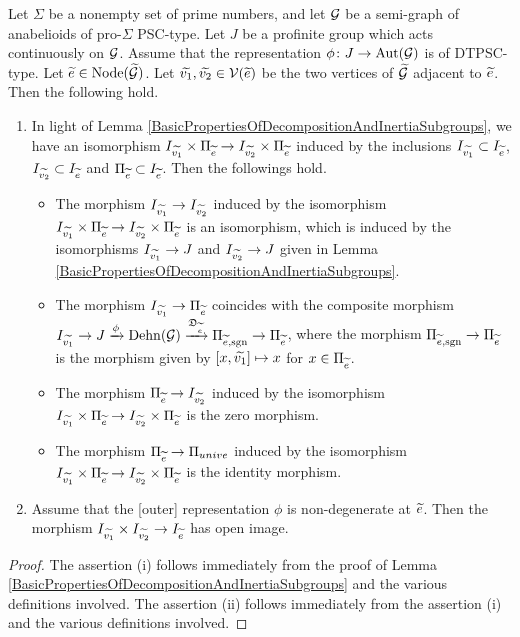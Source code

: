 \begin{lem}
  Let $\Sigma$ be a nonempty set of prime numbers, and let $\mathcal{G}$ be a semi-graph of anabelioids of pro-$\Sigma$ PSC-type. Let $J$ be a profinite group which acts continuously on $\mathcal{G}$. Assume that the representation $\phi \colon J \to \mathrm{Aut}(\mathcal{G})$ is of DTPSC-type. Let $\widetilde{e} \in \mathrm{Node}(\widetilde{\mathcal{G}})$. Let $\widetilde{v_1}, \widetilde{v_2} \in \mathcal{V}(\widetilde{e})$ be the two vertices of $\widetilde{\mathcal{G}}$ adjacent to $\widetilde{e}$. Then the following hold.
  \begin{enumerate}
    \item In light of Lemma \ref{BasicPropertiesOfDecompositionAndInertiaSubgroups}, we have an isomorphism $I_{\widetilde{v_1}} \times \Pi_{\widetilde{e}} \to I_{\widetilde{v_2}} \times \Pi_{\widetilde{e}}$ induced by the inclusions $I_{\widetilde{v_1}} \subset I_{\widetilde{e}}$, $I_{\widetilde{v_2}} \subset I_{\widetilde{e}}$ and $\Pi_{\widetilde{e}} \subset I_{\widetilde{e}}$. Then the followings hold.
    \begin{itemize}
      \item The morphism $I_{\widetilde{v_1}} \to I_{\widetilde{v_2}}$ induced by the isomorphism $I_{\widetilde{v_1}} \times \Pi_{\widetilde{e}} \to I_{\widetilde{v_2}} \times \Pi_{\widetilde{e}}$ is an isomorphism, which is induced by the isomorphisms $I_{\widetilde{v_1}} \to J$ and $I_{\widetilde{v_2}} \to J$ given in Lemma \ref{BasicPropertiesOfDecompositionAndInertiaSubgroups}.
      \item The morphism $I_{\widetilde{v_1}} \to \Pi_{\widetilde{e}}$ coincides with the composite morphism $I_{\widetilde{v_1}} \to J \xrightarrow{\phi} \mathrm{Dehn}(\mathcal{G}) \xrightarrow{\mathfrak{D}_{\widetilde{e}}} \Pi_{\widetilde{e}, \mathrm{sgn}} \to \Pi_{\widetilde{e}}$, where the morphism $\Pi_{\widetilde{e}, \mathrm{sgn}} \to \Pi_{\widetilde{e}}$ is the morphism given by $[x, \widetilde{v_1}] \mapsto x$ for $x \in \Pi_{\widetilde{e}}$.
      \item The morphism $\Pi_{\widetilde{e}} \to I_{\widetilde{v_2}}$ induced by the isomorphism $I_{\widetilde{v_1}} \times \Pi_{\widetilde{e}} \to I_{\widetilde{v_2}} \times \Pi_{\widetilde{e}}$ is the zero morphism.
      \item The morphism $\Pi_{\widetilde{e}} \to \Pi_{univ{e}}$ induced by the isomorphism $I_{\widetilde{v_1}} \times \Pi_{\widetilde{e}} \to I_{\widetilde{v_2}} \times \Pi_{\widetilde{e}}$ is the identity morphism.
    \end{itemize}
    \item Assume that the [outer] representation $\phi$ is non-degenerate at $\widetilde{e}$. Then the morphism $I_{\widetilde{v_1}} \times I_{\widetilde{v_2}} \to I_{\widetilde{e}}$ has open image.
  \end{enumerate}
\end{lem}
\begin{proof}
  The assertion (i) follows immediately from the proof of Lemma \ref{BasicPropertiesOfDecompositionAndInertiaSubgroups} and the various definitions involved. The assertion (ii) follows immediately from the assertion (i) and the various definitions involved.
\end{proof}

